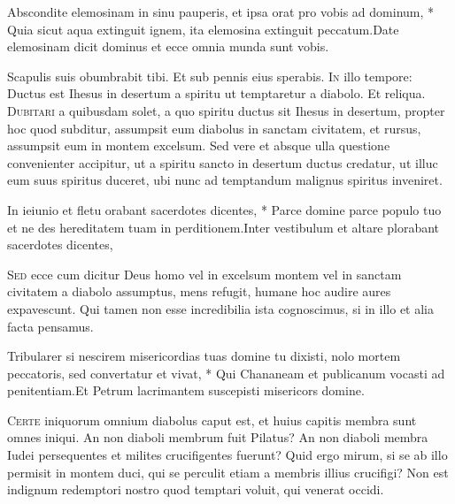 \begin{multicols*}{2}
\begin{responsory-doxology}
{Abscondite elemosinam in sinu pauperis, et ipsa orat pro vobis ad dominum, * Quia sicut aqua extinguit ignem, ita elemosina extinguit peccatum.}{Date elemosinam dicit dominus et ecce omnia munda sunt vobis.}
\end{responsory-doxology}
 \V Scapulis suis obumbrabit tibi. \R Et sub pennis eius sperabis.
\lettrine[lines=2]{\zallmancaps \color{Red} I}{n} illo tempore: Ductus est Ihesus in desertum a spiritu ut temptaretur a diabolo. Et reliqua.
\lettrine[lines=2]{\zallmancaps \color{Blue} D}{ubitari} a quibusdam solet, a quo spiritu ductus sit Ihesus in desertum, propter hoc quod subditur, assumpsit eum diabolus in sanctam civitatem, et rursus, assumpsit eum in montem excelsum. Sed vere et absque ulla questione convenienter accipitur, ut a spiritu sancto in desertum ductus credatur, ut illuc eum suus spiritus duceret, ubi nunc ad temptandum malignus spiritus inveniret.
\begin{responsory}[in-ieiunio]
{In ieiunio et fletu orabant sacerdotes dicentes, * Parce domine parce populo tuo et ne des hereditatem tuam in perditionem.}{Inter vestibulum et altare plorabant sacerdotes dicentes,}
\end{responsory}
\lettrine[lines=2]{\zallmancaps \color{Red} S}{ed} ecce cum dicitur Deus homo vel in excelsum montem vel in sanctam civitatem a diabolo assumptus, mens refugit, humane hoc audire aures expavescunt. Qui tamen non esse incredibilia ista cognoscimus, si in illo et alia facta pensamus.
\begin{responsory}[tribularer-si]
{Tribularer si nescirem misericordias tuas domine tu dixisti, nolo mortem peccatoris, sed convertatur et vivat, * Qui Chananeam et publicanum vocasti ad penitentiam.}{Et Petrum lacrimantem suscepisti misericors domine.}
\end{responsory}
\lettrine[lines=2]{\zallmancaps \color{Blue} C}{erte} iniquorum omnium diabolus caput est, et huius capitis membra sunt omnes iniqui. An non diaboli membrum fuit Pilatus? An non diaboli membra Iudei persequentes et milites crucifigentes fuerunt? Quid ergo mirum, si se ab illo permisit in montem duci, qui se perculit etiam a membris illius crucifigi? Non est indignum redemptori nostro quod temptari voluit, qui venerat occidi.

\end{multicols*}
